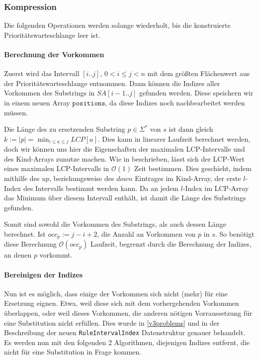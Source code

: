 \subsubsection{Kompression}

Die folgenden Operationen werden solange wiederholt, bis die konstruierte Prioritätswarteschlange leer ist. 

\paragraph{Berechnung der Vorkommen}

Zuerst wird das Intervall $[i..j]$, $0 < i \leq j < n$ mit dem größten Flächenwert aus der Prioritätswarteschlange entnommen. Dann können die Indizes aller Vorkommen des Substrings in $SA[i-1..j]$ gefunden werden. Diese speichern wir in einem neuen Array $\texttt{positions}$, da diese Indizes noch nachbearbeitet werden müssen.

Die Länge des zu ersetzenden Substring $p \in \Sigma^*$ von $s$ ist dann gleich $k := |p| = \min_{i \leq a \leq j} LCP[a]$.
Dies kann in linearer Laufzeit berechnet werden, doch wir können uns hier die Eigenschaften der maximalen LCP-Intervalle und des Kind-Arrays zunutze machen. 
Wie in \cite{abouelhoda_optimal_2002} beschrieben, lässt sich der LCP-Wert eines maximalen LCP-Intervalls in $\mathcal{O}(1)$ Zeit bestimmen. Dies geschieht, indem mithilfe des $up$, beziehungsweise des $down$ Eintrages im Kind-Array, der erste $l$-Index des Intervalls bestimmt werden kann. Da an jedem $l$-Index im LCP-Array das Minimum über diesem Intervall enthält, ist damit die Länge des Substrings gefunden.

Somit sind sowohl die Vorkommen des Substrings, als auch dessen Länge berechnet. Ist $occ_p := j - i + 2$, die Anzahl an Vorkommen von $p$ in $s$. So benötigt diese Berechnung $\mathcal{O}(occ_p)$ Laufzeit, begrenzt durch die Berechnung der Indizes, an denen $p$ vorkommt.

\paragraph{Bereinigen der Indizes}

Nun ist es möglich, dass einige der Vorkommen sich nicht (mehr) für eine Ersetzung eignen. Etwa, weil diese sich mit dem vorhergehenden Vorkommen überlappen, oder weil dieses Vorkommen, die anderen nötigen Vorraussetzung für eine Substitution nicht erfüllen. Dies wurde in \ref{v3problems} und in der Beschreibung der neuen \texttt{RuleIntervalIndex} Datenstruktur genauer behandelt. Es werden nun mit den folgenden 2 Algorithmen, diejenigen Indizes entfernt, die nicht für eine Substitution in Frage kommen.

